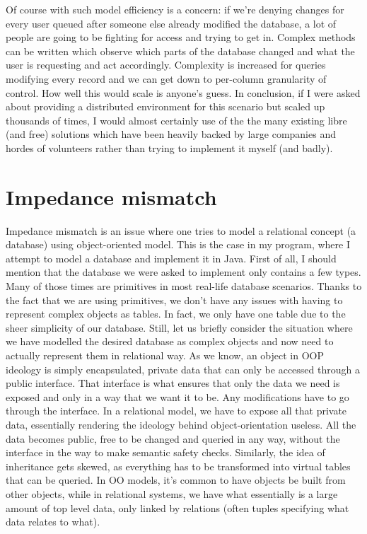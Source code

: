\documentclass{report}
\begin{document}
Of course with such model efficiency is a concern: if we're denying
changes for every user queued after someone else already modified the
database, a lot of people are going to be fighting for access and
trying to get in. Complex methods can be written which observe which
parts of the database changed and what the user is requesting and act
accordingly. Complexity is increased for queries modifying every
record and we can get down to per-column granularity of control. How
well this would scale is anyone's guess. In conclusion, if I were
asked about providing a distributed environment for this scenario but
scaled up thousands of times, I would almost certainly use of the the
many existing libre (and free) solutions which have been heavily
backed by large companies and hordes of volunteers rather than trying
to implement it myself (and badly).

\section*{Impedance mismatch}
Impedance mismatch is an issue where one tries to model a relational
concept (a database) using object-oriented model. This is the case in
my program, where I attempt to model a database and implement it in
Java. First of all, I should mention that the database we were asked
to implement only contains a few types. Many of those times are
primitives in most real-life database scenarios. Thanks to the fact
that we are using primitives, we don't have any issues with having to
represent complex objects as tables. In fact, we only have one table
due to the sheer simplicity of our database. Still, let us briefly
consider the situation where we have modelled the desired database as
complex objects and now need to actually represent them in relational
way. As we know, an object in OOP ideology is simply encapsulated,
private data that can only be accessed through a public interface.
That interface is what ensures that only the data we need is exposed
and only in a way that we want it to be. Any modifications have to go
through the interface. In a relational model, we have to expose all
that private data, essentially rendering the ideology behind
object-orientation useless. All the data becomes public, free to be
changed and queried in any way, without the interface in the way to
make semantic safety checks. Similarly, the idea of inheritance gets
skewed, as everything has to be transformed into virtual tables that
can be queried. In OO models, it's common to have objects be built
from other objects, while in relational systems, we have what
essentially is a large amount of top level data, only linked by
relations (often tuples specifying what data relates to what).
\end{document}

